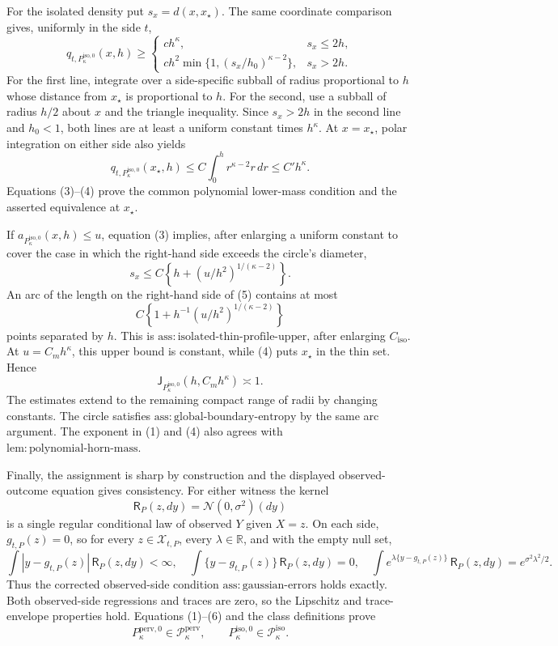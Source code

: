 For the isolated density put \(s_x=d(x,x_{\star})\). The same coordinate comparison gives, uniformly in the side \(t\),
\[
 q_{t,P_{\kappa}^{\mathrm{iso},0}}(x,h)\ge
 \begin{cases}
 c h^{\kappa},&s_x\le2h,\\
 c h^2\min\{1,(s_x/h_0)^{\kappa-2}\},&s_x>2h.
 \end{cases} \tag{3}
\]
For the first line, integrate over a side-specific subball of radius proportional to \(h\) whose distance from \(x_{\star}\) is proportional to \(h\). For the second, use a subball of radius \(h/2\) about \(x\) and the triangle inequality. Since \(s_x>2h\) in the second line and \(h_0<1\), both lines are at least a uniform constant times \(h^{\kappa}\). At \(x=x_{\star}\), polar integration on either side also yields
\[
 q_{t,P_{\kappa}^{\mathrm{iso},0}}(x_{\star},h)
 \le C\int_0^h r^{\kappa-2}r\,dr
 \le C'h^{\kappa}. \tag{4}
\]
Equations (3)--(4) prove the common polynomial lower-mass condition and the asserted equivalence at \(x_{\star}\).

If \(a_{P_{\kappa}^{\mathrm{iso},0}}(x,h)\le u\), equation (3) implies, after enlarging a uniform constant to cover the case in which the right-hand side exceeds the circle's diameter,
\[
 s_x\le C\left\{h+(u/h^2)^{1/(\kappa-2)}\right\}. \tag{5}
\]
An arc of the length on the right-hand side of (5) contains at most
\[
 C\left\{1+h^{-1}(u/h^2)^{1/(\kappa-2)}\right\}
\]
points separated by \(h\). This is \(\mathrm{ass:isolated\text{-}thin\text{-}profile\text{-}upper}\), after enlarging \(C_{\mathrm{iso}}\). At \(u=C_mh^{\kappa}\), this upper bound is constant, while (4) puts \(x_{\star}\) in the thin set. Hence
\[
 \mathsf J_{P_{\kappa}^{\mathrm{iso},0}}(h,C_mh^{\kappa})\asymp1. \tag{6}
\]
The estimates extend to the remaining compact range of radii by changing constants. The circle satisfies \(\mathrm{ass:global\text{-}boundary\text{-}entropy}\) by the same arc argument. The exponent in (1) and (4) also agrees with \(\mathrm{lem:polynomial\text{-}horn\text{-}mass}\).

Finally, the assignment is sharp by construction and the displayed observed-outcome equation gives consistency. For either witness the kernel
\[
 \mathsf R_P(z,dy)=\mathcal N(0,\sigma^2)(dy)
\]
is a single regular conditional law of observed \(Y\) given \(X=z\). On each side, \(g_{t,P}(z)=0\), so for every \(z\in\mathcal X_{t,P}\), every \(\lambda\in\mathbb R\), and with the empty null set,
\[
 \int |y-g_{t,P}(z)|\,\mathsf R_P(z,dy)<\infty,
 \quad
 \int \{y-g_{t,P}(z)\}\,\mathsf R_P(z,dy)=0,
 \quad
 \int e^{\lambda\{y-g_{t,P}(z)\}}\,\mathsf R_P(z,dy)
 =e^{\sigma^2\lambda^2/2}.
\]
Thus the corrected observed-side condition \(\mathrm{ass:gaussian\text{-}errors}\) holds exactly. Both observed-side regressions and traces are zero, so the Lipschitz and trace-envelope properties hold. Equations (1)--(6) and the class definitions prove
\[
 P_{\kappa}^{\mathrm{perv},0}\in\mathcal P_{\kappa}^{\mathrm{perv}},
 \qquad
 P_{\kappa}^{\mathrm{iso},0}\in\mathcal P_{\kappa}^{\mathrm{iso}}.
\]